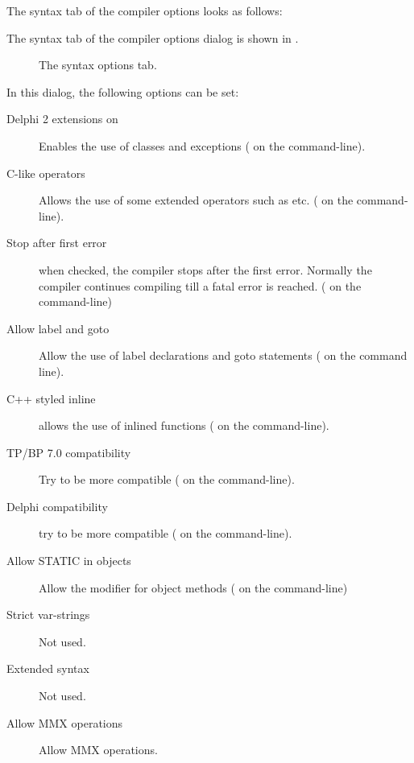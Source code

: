 \begin{htmlonly}
The syntax tab of the compiler options  looks as follows:
\end{htmlonly}
\begin{latexonly}
The syntax tab of the compiler options dialog is shown in .
\begin{figure}[ht]
\begin{center}
\caption{The syntax options tab.}\label{fig:ocompa}
\ifpdf
{}
\else
{}
\fi
\end{center}
\end{figure}
\end{latexonly}
In this dialog, the following options can be set:
\begin{description}
\item[Delphi 2 extensions on]
Enables the use of classes and exceptions ( on the command-line).
\item[C-like operators]
Allows the use of some extended operators such as \var{+=, -=} etc.
( on the command-line).
\item[Stop after first error]  when checked, the compiler stops after the
first error. Normally the compiler continues compiling till a fatal error is
reached. ( on the command-line)
\item[Allow label and goto] Allow the use of label declarations and goto
statements ( on the command line).
\item[C++ styled inline] allows the use of inlined functions ( on
the command-line).
\item[TP/BP 7.0 compatibility] Try to be more \tp compatible ( on
the command-line).
\item[Delphi compatibility] try to be more \delphi compatible ( on
the command-line).
\item[Allow STATIC in objects] Allow the  modifier for object
methods ( on the command-line)
\item[Strict var-strings] Not used.
\item[Extended syntax] Not used.
\item[Allow MMX operations] Allow MMX operations.
\end{description}

